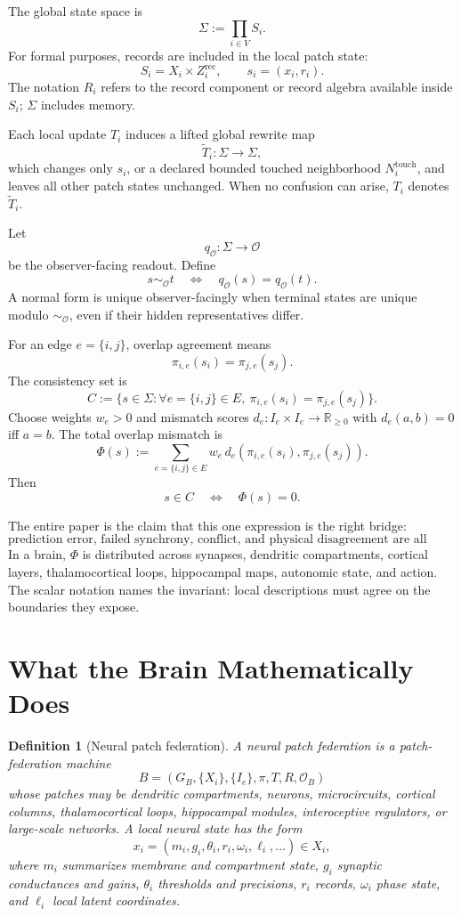 \documentclass[11pt]{article}
\newtheorem{definition}[theorem]{Definition}
\theoremstyle{remark}
\theoremstyle{plain}
\newcommand{\R}{\mathbb R}
\newcommand{\rec}{\mathrm{rec}}
\begin{document}
The global state space is
\[
\Sigma:=\prod_{i\in V}S_i.
\]
For formal purposes, records are included in the local patch state:
\[
S_i=X_i\times Z_i^{\rec},
\qquad
s_i=(x_i,r_i).
\]
The notation \(R_i\) refers to the record component or record algebra available inside \(S_i\); \(\Sigma\) includes memory.

Each local update \(T_i\) induces a lifted global rewrite map
\[
\widetilde T_i:\Sigma\to\Sigma,
\]
which changes only \(s_i\), or a declared bounded touched neighborhood \(N_i^{\mathrm{touch}}\), and leaves all other patch states unchanged. When no confusion can arise, \(T_i\) denotes \(\widetilde T_i\).

Let
\[
q_{\mathcal O}:\Sigma\to\mathcal O
\]
be the observer-facing readout. Define
\[
s\sim_{\mathcal O}t
\quad\Longleftrightarrow\quad
q_{\mathcal O}(s)=q_{\mathcal O}(t).
\]
A normal form is unique observer-facingly when terminal states are unique modulo \(\sim_{\mathcal O}\), even if their hidden representatives differ.

For an edge \(e=\{i,j\}\), overlap agreement means
\[
\pi_{i,e}(s_i)=\pi_{j,e}(s_j).
\]
The consistency set is
\[
C:=\bigl\{s\in\Sigma:\forall e=\{i,j\}\in E,\
\pi_{i,e}(s_i)=\pi_{j,e}(s_j)\bigr\}.
\]
Choose weights \(w_e>0\) and mismatch scores \(d_e:I_e\times I_e\to\R_{\ge 0}\) with \(d_e(a,b)=0\) iff \(a=b\). The total overlap mismatch is
\[
\Phi(s)
:=
\sum_{e=\{i,j\}\in E}
w_e\,d_e\!\left(\pi_{i,e}(s_i),\pi_{j,e}(s_j)\right).
\]
Then
\[
s\in C\quad\Longleftrightarrow\quad \Phi(s)=0.
\]

The entire paper is the claim that this one expression is the right bridge:
\[
\boxed{
\text{prediction error, failed synchrony, conflict, and physical disagreement are all overlap mismatch.}
}
\]
In a brain, \(\Phi\) is distributed across synapses, dendritic compartments, cortical layers, thalamocortical loops, hippocampal maps, autonomic state, and action. The scalar notation names the invariant: local descriptions must agree on the boundaries they expose.

\section{What the Brain Mathematically Does}

\begin{definition}[Neural patch federation]
A neural patch federation is a patch-federation machine
\[
B=(G_B,\{X_i\},\{I_e\},\pi,T,R,\mathcal O_B)
\]
whose patches may be dendritic compartments, neurons, microcircuits, cortical columns, thalamocortical loops, hippocampal modules, interoceptive regulators, or large-scale networks. A local neural state has the form
\[
x_i=(m_i,g_i,\theta_i,r_i,\omega_i,\ell_i,\ldots)\in X_i,
\]
where \(m_i\) summarizes membrane and compartment state, \(g_i\) synaptic conductances and gains, \(\theta_i\) thresholds and precisions, \(r_i\) records, \(\omega_i\) phase state, and \(\ell_i\) local latent coordinates.
\end{definition}
\end{document}
